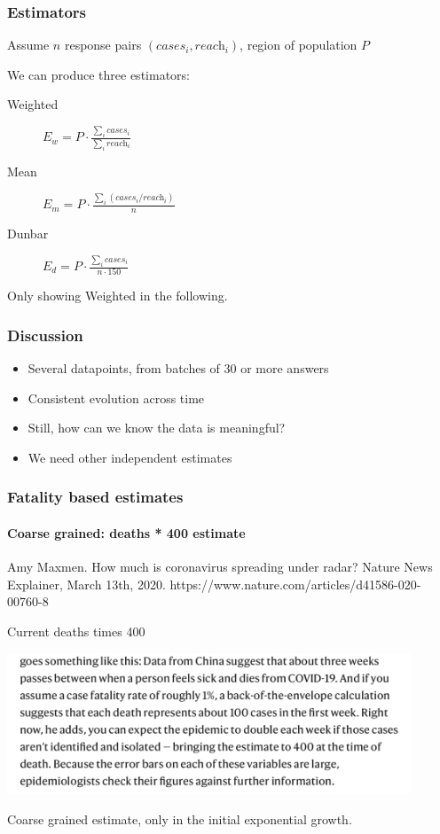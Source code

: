 \documentclass{beamer}
\begin{document}
\begin{frame}
  \frametitle{Estimators}
  Assume $n$ response pairs $(\textit{cases}_i,\textit{reach}_i)$, region of population $P$  

  We can produce three estimators: 
  \begin{description}
    \item[Weighted] $E_w  =  P \cdot \frac{\sum_{i} \textit{cases}_i}{\sum_{i} \textit{reach}_i}$  
    \item[Mean] $E_m  =  P \cdot \frac{\sum_i (\textit{cases}_i / \textit{reach}_i)}{n}$
    \item[Dunbar] $E_d  =  P \cdot \frac{\sum_{i} \textit{cases}_i}{n \cdot 150}$
  \end{description}
Only showing  Weighted in the following. 
\end{frame}


\begin{frame}
  \frametitle{Discussion}

  \begin{itemize}
    \item Several datapoints, from batches of 30 or more answers  
    \item Consistent evolution across time
  \end{itemize} \pause

  \begin{itemize}
    \item Still, how can we know the data is meaningful?   
    \item We need other independent estimates 
  \end{itemize}

\end{frame}

\begin{frame}
  \frametitle{Fatality based estimates}
  \framesubtitle{Coarse grained: deaths * 400 estimate}
  Amy Maxmen. How much is coronavirus spreading under radar? 
  Nature News Explainer, March 13th, 2020. https://www.nature.com/articles/d41586-020-00760-8

  \begin{block}{Current deaths times 400}
  \begin{center}
  \includegraphics[width=0.9\textwidth]{Amy.png}
  \end{center}
  \end{block}
  Coarse grained estimate, only in the initial exponential growth. 
\end{frame}
\end{document}
